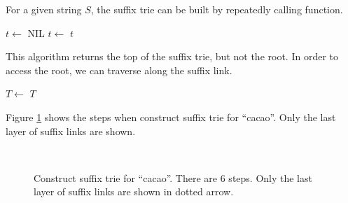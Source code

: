 \documentclass{article}
\begin{document}
For a given string $S$, the suffix trie can be built by repeatedly
calling  function.

\begin{algorithmic}[1]
  \State $t \gets$ NIL
    \State $t \gets$ 
  \EndFor
  \State \Return $t$
\EndFunction
\end{algorithmic}

This algorithm returns the top of the suffix trie, but not the root.
In order to access the root, we can traverse along the suffix link.

\begin{algorithmic}[1]
    \State $T \gets$ 
  \EndWhile
  \State \Return $T$
\EndFunction
\end{algorithmic}

Figure \ref{fig:cons-strie-cacao} shows the steps
when construct suffix trie for ``cacao''.
Only the last layer of suffix links are shown.

\begin{figure}[htbp]
  \centering
   \\
  \caption{Construct suffix trie for ``cacao''. There are 6 steps. Only the last layer of suffix links are shown in dotted arrow.}
  \label{fig:cons-strie-cacao}
\end{figure}
\end{document}

